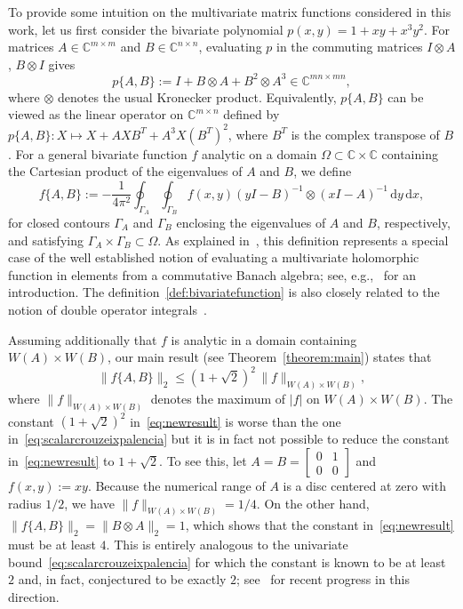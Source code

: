 \documentclass[11pt,a4paper]{amsart}
\newcommand{\C}{{\mathbb C}}
\begin{document}
To provide some intuition on the multivariate matrix functions considered in this work, let us first consider the bivariate polynomial $p(x,y) = 1 + xy + x^3 y^2$. For matrices $A \in \C^{m\times m}$ and 
$B \in \C^{n\times n}$, evaluating $p$ in the commuting matrices 
$I\otimes A$, $B \otimes I$ gives
\[
 p\{A,B\} := I + B \otimes A + B^2 \otimes A^3 \in \C^{mn\times mn},
\]
where $\otimes$ denotes the usual Kronecker product.
Equivalently, $p\{A,B\}$ can be viewed as the linear operator on $\C^{m \times n}$ defined
by $p\{A,B\}: X\mapsto X + A X B^T + A^3 X (B^T)^2$, where $B^T$ is the complex transpose of $B$. For a general bivariate function $f$ analytic on a domain $\Omega \subset \C \times \C$ containing the Cartesian product of the eigenvalues of $A$ and $B$, we define
\begin{equation} \label{def:bivariatefunction}
  f\{A,B\} := -\frac{1}{4\pi^2} \oint_{\Gamma_A} \oint_{\Gamma_B} f(x,y) (yI-B)^{-1} \otimes (xI-A)^{-1}\,\text{d}y\,\text{d}x,
\end{equation}
for closed contours $\Gamma_A$ and $\Gamma_B$ enclosing the eigenvalues of $A$ and $B$, respectively, and satisfying $\Gamma_A \times \Gamma_B \subset \Omega$. As explained in~\cite{Kressner2014bivariate}, this definition represents a special case of the well established notion of evaluating a multivariate holomorphic function in elements from a commutative Banach algebra; see, e.g.,~\cite{Biller2007} for an introduction. The definition~\eqref{def:bivariatefunction} is also closely related to the notion of double operator integrals~\cite{Skripka2020}.

Assuming additionally that $f$ is analytic in a domain containing  $W(A)\times W(B)$, our main result (see Theorem~\ref{theorem:main}) states that
\begin{equation} \label{eq:newresult}
  \|f\{A,B\}\|_2 \le (1+\sqrt{2})^2\, \|f\|_{W(A)\times W(B)},
\end{equation}
where $\|f\|_{W(A)\times W(B)}$ denotes the maximum of $|f|$ on $W(A) \times W(B)$.
The constant $(1+\sqrt{2})^2$ in~\eqref{eq:newresult} is worse than the one in~\eqref{eq:scalarcrouzeixpalencia} but it is in fact not possible to reduce the constant in~\eqref{eq:newresult} to $1+\sqrt{2}$. To see this, let $A = B = \begin{bmatrix} 0 & 1 \\ 0 & 0 \end{bmatrix}$ and $f(x,y) := xy$. Because the numerical range of $A$ is a disc centered at zero with radius $1/2$, we have
$\|f\|_{W(A)\times W(B)} = 1/4$.
On the other hand, $\|f\{A,B\}\|_2 = \|B\otimes A\|_2 = 1$, which shows that the constant in~\eqref{eq:newresult} must be at least $4$. This is entirely analogous to the univariate bound~\eqref{eq:scalarcrouzeixpalencia} for which the constant is known to be at least $2$ and, in fact, conjectured to be exactly $2$; see~\cite{Cadwell2018,Glader2018,Greenbaum2018,Ransford2018} for recent progress in this direction.
\end{document}

